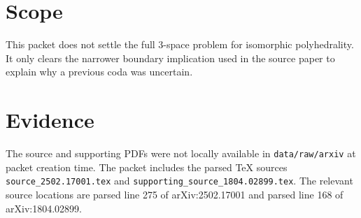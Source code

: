 \documentclass[11pt]{article}
\begin{document}
\section*{Scope}

This packet does not settle the full 3-space problem for isomorphic
polyhedrality.  It only clears the narrower boundary implication used in the
source paper to explain why a previous coda was uncertain.

\section*{Evidence}

The source and supporting PDFs were not locally available in
\texttt{data/raw/arxiv} at packet creation time.  The packet includes the parsed
TeX sources \texttt{source\_2502.17001.tex} and
\texttt{supporting\_source\_1804.02899.tex}.  The relevant source locations are
parsed line 275 of arXiv:2502.17001 and parsed line 168 of arXiv:1804.02899.
\end{document}
